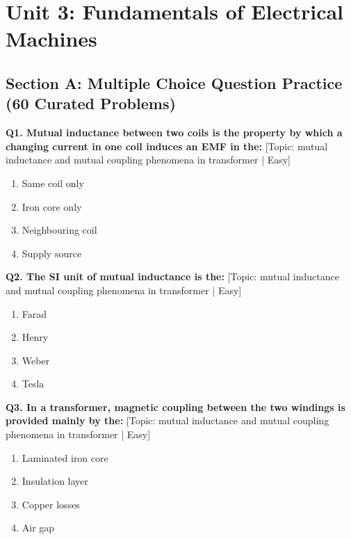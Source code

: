 \chapter{Unit 3: Fundamentals of Electrical Machines}

\section{Section A: Multiple Choice Question Practice (60 Curated Problems)}

\noindent\textbf{Q1. Mutual inductance between two coils is the property by which a changing current in one coil induces an EMF in the:} \hfill [Topic: mutual inductance and mutual coupling phenomena in transformer | Easy]
\begin{enumerate}[label=(\alph*),topsep=2pt,itemsep=1pt,partopsep=0pt,parsep=0pt]
    \item {Same coil only}
    \item {Iron core only}
    \item {Neighbouring coil}
    \item {Supply source}
\end{enumerate}
\vspace{2mm}

\noindent\textbf{Q2. The SI unit of mutual inductance is the:} \hfill [Topic: mutual inductance and mutual coupling phenomena in transformer | Easy]
\begin{enumerate}[label=(\alph*),topsep=2pt,itemsep=1pt,partopsep=0pt,parsep=0pt]
    \item {Farad}
    \item {Henry}
    \item {Weber}
    \item {Tesla}
\end{enumerate}
\vspace{2mm}

\noindent\textbf{Q3. In a transformer, magnetic coupling between the two windings is provided mainly by the:} \hfill [Topic: mutual inductance and mutual coupling phenomena in transformer | Easy]
\begin{enumerate}[label=(\alph*),topsep=2pt,itemsep=1pt,partopsep=0pt,parsep=0pt]
    \item {Laminated iron core}
    \item {Insulation layer}
    \item {Copper losses}
    \item {Air gap}
\end{enumerate}
\vspace{2mm}

